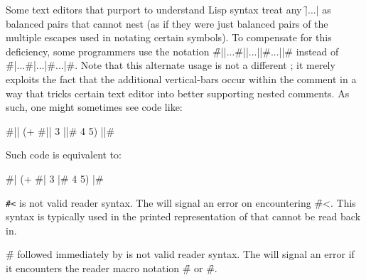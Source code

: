 \endsubsubsubsection%


Some text editors that purport to understand Lisp syntax treat any \f{|...|}
as balanced pairs that cannot nest (as if they were just balanced pairs of 
the multiple escapes used in notating certain symbols).  To compensate for 
this deficiency, some programmers use the notation \f{\#||...\#||...||\#...||\#}
instead of \f{\#|...\#|...|\#...|\#}.   Note that this alternate usage is not
a different ; it merely exploits the fact that the additional
vertical-bars occur within the comment in a way that tricks certain text editor
into better supporting nested comments.  As such, one might sometimes see code
like:

\code
 #|| (+ #|| 3 ||# 4 5) ||# 
\endcode

Such code is equivalent to:

\code
 #| (+ #| 3 |# 4 5) |#
\endcode

\endsubsubsubsection%

\endsubsubsection%



{\tt  \#<} is not valid reader syntax.
The  will signal an error 
on encountering \f{\#<}.
This syntax is typically used in the printed representation 
of  that cannot be read back in.  

\endsubsubsection%




\f{\#} followed immediately by  is not valid reader syntax.
The  will signal an error  if it
encounters the reader macro notation \f{\#\NewlineChar} or \f{\#\SpaceChar}.

\endsubsubsection%


